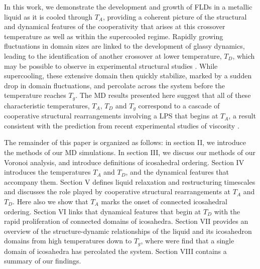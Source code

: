 \documentclass[aps,prl,preprint,showpacs,amsmath,floatfix,superscriptaddress]{revtex4}
\begin{document}
In this work, we demonstrate the development and growth of FLDs in
a metallic liquid as it is cooled through $T_{A}$, providing a
coherent picture of the structural and dynamical features of the
cooperativity that arises at this crossover temperature as well as
within the supercooled regime. Rapidly growing fluctuations in
domain sizes are linked to the development of glassy dynamics,
leading to the identification of another crossover at lower
temperature, $T_{D}$, which may be possible to observe in
experimental structural studies \cite{Mauro2013, Mauro2014}.
While supercooling, these extensive domain then quickly stabilize,
marked by a sudden drop in domain fluctuations, and percolate across
the system before the temperature reaches $T_{g}$. The MD results presented here suggest that all of
these characteristic temperatures, $T_{A}$, $T_{D}$ and $T_{g}$
correspond to a cascade of cooperative structural rearrangements
involving a LPS that begins at $T_{A}$, a result consistent with
the prediction from recent experimental studies of viscosity
\cite{Kelton2014}.

The remainder of this paper is organized as follows: in section
II, we introduce the methods of our MD simulations. In
section III, we discuss our methods of our Voronoi analysis, and introduce
definitions of icosahedral ordering. Section IV introduces the temperatures
$T_{A}$ and $T_{D}$, and the dynamical features that accompany them.
Section V defines liquid relaxation and restructuring timescales and discusses the role
played by cooperative structural rearrangements at $T_{A}$ and $T_{D}$.
Here also we show that $T_{A}$ marks the onset of connected icosahedral ordering.
Section VI links that dynamical features that begin at $T_{D}$ with the rapid
proliferation of connected domains of icosahedra. Section VII provides an overview
of the structure-dynamic relationships of the liquid and its icosahedron domains from high temperatures
down to $T_{g}$, where were find that a single domain of icosahedra has percolated the system.
Section VIII contains a summary of our findings.
\end{document}
